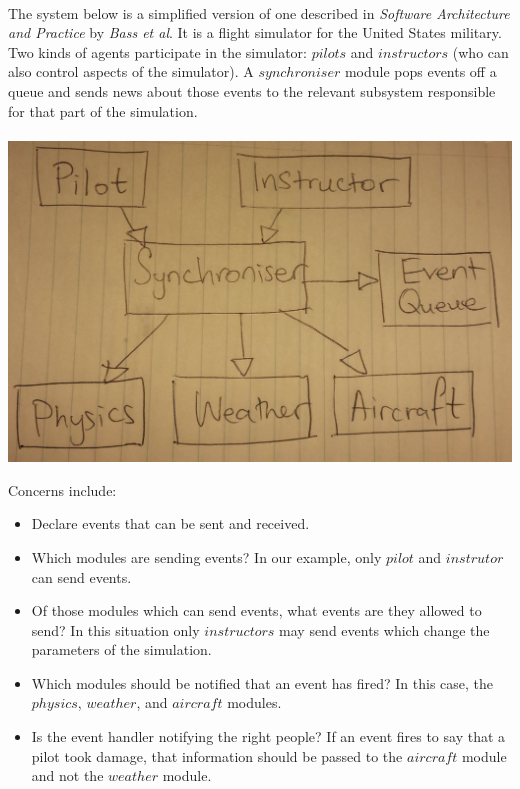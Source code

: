 \documentclass{article}
\begin{document}
\paragraph{}
The system below is a simplified version of one described in \textit{Software Architecture and Practice} by \textit{Bass et al}. It is a flight simulator for the United States military. Two kinds of agents participate in the simulator: $pilots$ and $instructors$ (who can also control aspects of the simulator). A $synchroniser$ module pops events off a queue and sends news about those events to the relevant subsystem responsible for that part of the simulation.

\paragraph{}
\includegraphics[width=\textwidth]{aircraft-sim.jpeg}

Concerns include:
\begin{itemize}
	\item Declare events that can be sent and received.
	\item Which modules are sending events? In our example, only $pilot$ and $instrutor$ can send events.
	\item Of those modules which can send events, what events are they allowed to send? In this situation only $instructors$ may send events which change the parameters of the simulation.
	\item Which modules should be notified that an event has fired? In this case, the $physics$, $weather$, and $aircraft$ modules.
	\item Is the event handler notifying the right people? If an event fires to say that a pilot took damage, that information should be passed to the $aircraft$ module and not the $weather$ module.
\end{itemize}
\end{document}

